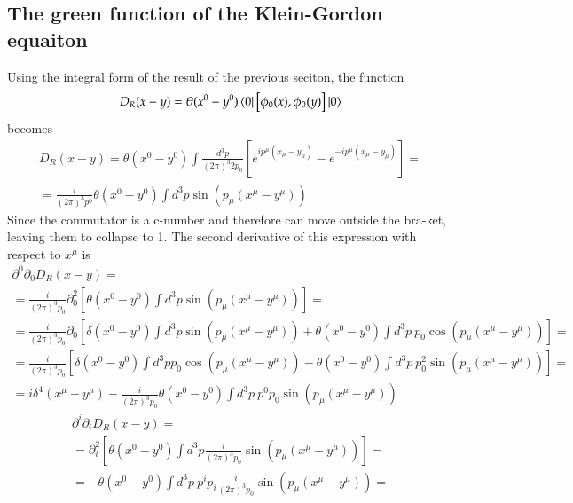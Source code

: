 \documentclass{article}
\begin{document}
\subsection{The green function of the Klein-Gordon equaiton}
Using the integral form of the result of the previous seciton, the function
\begin{equation}
    D_R(x - y) = \theta(x^0 - y^0)\bra{0}\left[\phi_0(x), \phi_0(y)\right]\ket{0}
\end{equation}
becomes
\begin{equation}
\begin{gathered}
    D_R(x - y) = \theta(x^0 - y^0) \int \frac{d^3p}{(2\pi)^3 2 p_0}
    \left[
        e^{i p^\mu \left(x_\mu - y_\mu\right)} -
        e^{-i p^\mu \left(x_\mu - y_\mu\right)}
    \right] = 
    \\
    = \frac{i}{(2\pi)^3 p^0} \theta(x^0 - y^0) \int d^3p
    \sin\left(p_\mu \left(x^\mu - y^\mu\right)\right)
\end{gathered}
\end{equation}
Since the commutator is a c-number and therefore can move outside the bra-ket, leaving them to collapse to 1.
The second derivative of this expression with respect to $x^\mu$ is
\begin{equation}
\begin{gathered}
    \partial^0 \partial_0 D_R(x-y) =
    \\
    = \frac{i}{(2\pi)^3 p_0} \partial_0^2 \left[\theta(x^0 - y^0) \int d^3p
    \sin\left(p_\mu \left(x^\mu - y^\mu\right)\right)\right] =
    \\
    = \frac{i}{(2\pi)^3 p_0} \partial_0 \left[
        \delta(x^0 - y^0) \int d^3p
        \sin\left(p_\mu \left(x^\mu - y^\mu\right)\right) + 
        \theta(x^0 - y^0) \int d^3p \
        p_0\cos\left(p_\mu \left(x^\mu - y^\mu\right)\right)
    \right] =
    \\
    = \frac{i}{(2\pi)^3 p_0} \left[
        \delta(x^0 - y^0) \int d^3p
        p_0\cos\left(p_\mu \left(x^\mu - y^\mu\right)\right) -
        \theta(x^0 - y^0) \int d^3p \
        p_0^2\sin\left(p_\mu \left(x^\mu - y^\mu\right)\right)
    \right] =
    \\
    = i\delta^4(x^\mu - y^\mu) - \frac{i}{(2\pi)^3 p_0} \theta(x^0 - y^0) \int d^3p \
        p^0 p_0 \sin\left(p_\mu \left(x^\mu - y^\mu\right)\right)
\end{gathered}
\end{equation}
\begin{equation}
\begin{gathered}
    \partial^i \partial_i D_R(x-y) =
    \\
    = \partial_i^2 \left[\theta(x^0 - y^0) \int d^3p \frac{i}{(2\pi)^3 p_0}
    \sin\left(p_\mu \left(x^\mu - y^\mu\right)\right)\right] = 
    \\
    = - \theta(x^0 - y^0) \int d^3p \ p^i p_i \frac{i}{(2\pi)^3 p_0}
    \sin\left(p_\mu \left(x^\mu - y^\mu\right)\right) = 
\end{gathered}
\end{equation}
\end{document}
